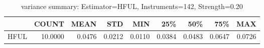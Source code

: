 \begin{table}[ht]
\centering
\caption{variance summary: Estimator=HFUL, Instruments=142, Strength=0.20}
\begin{tabular}{lrrrrrrrr}
\toprule
 & COUNT & MEAN & STD & MIN & 25\% & 50\% & 75\% & MAX \\
\midrule
HFUL & 10.0000 & 0.0476 & 0.0212 & 0.0110 & 0.0384 & 0.0483 & 0.0647 & 0.0726 \\
\bottomrule
\end{tabular}
\end{table}
